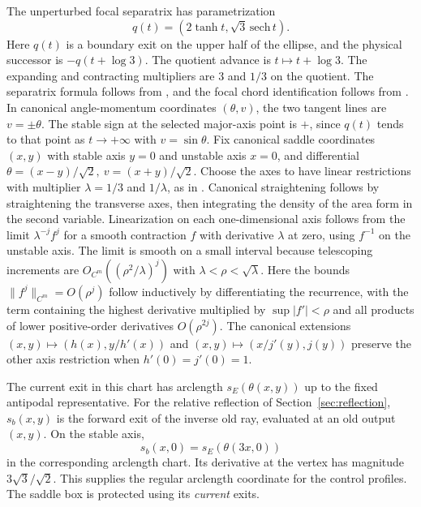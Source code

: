 \documentclass[11pt]{article}
\begin{document}
The unperturbed focal separatrix has parametrization \[
 q(t)=(2\tanh t,\sqrt3\,\mathrm{sech}\,t).
\] Here \(q(t)\) is a boundary exit on the upper half of the ellipse,
and the physical successor is \(-q(t+\log3)\). The quotient advance
is \(t\mapsto t+\log3\). The expanding and contracting
multipliers are 3 and \(1/3\) on the quotient. The separatrix formula follows
from \cite[Lemma 4.1]{DRR}, and the focal chord identification follows from
\cite[Lemma 2.2]{DCRR}. In canonical angle-momentum coordinates \((\theta,v)\),
the two tangent lines are \(v=\pm\theta\). The stable sign at the selected
major-axis point is \(+\), since \(q(t)\) tends to that point as \(t\to+\infty\)
with \(v=\sin\theta\). Fix canonical saddle coordinates \((x,y)\) with stable
axis \(y=0\) and unstable axis \(x=0\), and differential
\(\theta=(x-y)/\sqrt2,\ v=(x+y)/\sqrt2\). Choose the axes to have linear
restrictions with multiplier \(\lambda=1/3\) and \(1/\lambda\), as in
\cite[\S6.1]{BT}. Canonical straightening follows by straightening the
transverse axes, then integrating the density of the area form in the second
variable. Linearization on each one-dimensional axis follows from the limit
\(\lambda^{-j} f^j\) for a smooth contraction \(f\) with derivative \(\lambda\)
at zero, using \(f^{-1}\) on the unstable axis. The limit is smooth on a small
interval because telescoping increments are \(O_{C^m}((\rho^2/\lambda)^j)\) with
\(\lambda<\rho<\sqrt\lambda\). Here the bounds \(\|f^j\|_{C^m}=O(\rho^j)\)
follow inductively by differentiating the recurrence, with the term containing
the highest derivative multiplied by \(\sup|f'|<\rho\) and all products of lower
positive-order derivatives \(O(\rho^{2j})\). The canonical extensions
\((x,y)\mapsto(h(x),y/h'(x))\) and \((x,y)\mapsto(x/j'(y),j(y))\) preserve the
other axis restriction when \(h'(0)=j'(0)=1\).

The current exit in this chart has arclength
\(s_E(\theta(x,y))\) up to the fixed antipodal representative.
For the relative reflection of Section~\ref{sec:reflection},
\(s_b(x,y)\) is the forward exit of the inverse old ray, evaluated
at an old output \((x,y)\). On the stable axis,
\[
 s_b(x,0)=s_E(\theta(3x,0))
\]
in the corresponding arclength chart. Its derivative at the vertex
has magnitude \(3\sqrt3/\sqrt2\). This supplies the regular arclength
coordinate for the control profiles. The saddle box is protected
using its \emph{current} exits.
\end{document}
